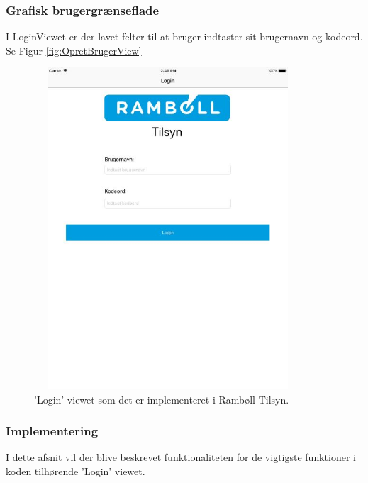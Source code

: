 \subsubsection{Grafisk brugergrænseflade}
I LoginViewet er der lavet felter til at bruger indtaster sit brugernavn og kodeord. Se Figur \ref{fig:OpretBrugerView}
\begin{figure}[H] %
	\centering
	\includegraphics[height=12cm, width=10cm]{../ArkitekturDesign/Design/Login/LoginView}
	\caption{'Login' viewet som det er implementeret i Rambøll Tilsyn.}
	\label{fig:LoginView}
\end{figure}

\clearpage

\subsubsection{Implementering}
I dette afsnit vil der blive beskrevet funktionaliteten for de vigtigste funktioner i koden tilhørende 'Login' viewet.

